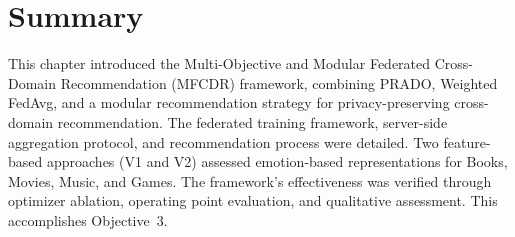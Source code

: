 \section{Summary}
This chapter introduced the Multi-Objective and Modular Federated Cross-Domain Recommendation (MFCDR) framework, combining PRADO, Weighted FedAvg, and a modular recommendation strategy for privacy-preserving cross-domain recommendation. The federated training framework, server-side aggregation protocol, and recommendation process were detailed. Two feature-based approaches (V1 and V2) assessed emotion-based representations for Books, Movies, Music, and Games. The framework's effectiveness was verified through optimizer ablation, operating point evaluation, and qualitative assessment. This accomplishes Objective~3.

